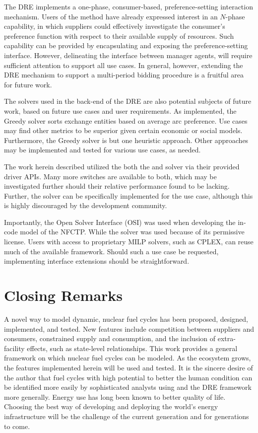 The DRE implements a one-phase, consumer-based, preference-setting interaction
mechanism. Users of the method have already expressed interest in an $N$-phase
capability, in which suppliers could effectively investigate the consumer's
preference function with respect to their available supply of resources. Such
capability can be provided by encapsulating and exposing the preference-setting
interface. However, delineating the interface between manager agents, will
require sufficient attention to support all use cases. In general, however,
extending the DRE mechanism to support a multi-period bidding procedure is a
fruitful area for future work.

The solvers used in the back-end of the DRE are also potential subjects of
future work, based on future use cases and user requirements. As implemented,
the Greedy solver sorts exchange entities based on average arc preference. Use
cases may find other metrics to be superior given certain economic or social
models. Furthermore, the Greedy solver is but one heuristic approach. Other
approaches may be implemented and tested for various use cases, as needed.

The work herein described utilized the both the \cbc and \clp solver via their
provided driver APIs. Many more switches are available to both, which may be
investigated further should their relative performance found to be
lacking. Further, the \cbc solver can be specifically implemented for the \Cyclus
use case, although this is highly discouraged by the \cbc development community. 

Importantly, the Open Solver Interface (OSI) was used when developing the
in-code model of the NFCTP. While the \cbc solver was used because of its
permissive license. Users with access to proprietary MILP solvers, such as
CPLEX, can reuse much of the available framework. Should such a use case be
requested, implementing interface extensions should be straightforward.

\section{Closing Remarks}

A novel way to model dynamic, nuclear fuel cycles has been proposed, designed,
implemented, and tested. New features include competition between suppliers and
consumers, constrained supply and consumption, and the inclusion of
extra-facility effects, such as state-level relationships. This work provides a
general framework on which nuclear fuel cycles can be modeled. As the \Cyclus
ecosystem grows, the features implemented herein will be used and tested. It is
the sincere desire of the author that fuel cycles with high potential to better
the human condition can be identified more easily by sophisticated analysts
using \Cyclus and the DRE framework more generally. Energy use has long been
known to better quality of life. Choosing the best way of developing and
deploying the world's energy infrastructure will be the challenge of the current
generation and for generations to come.
